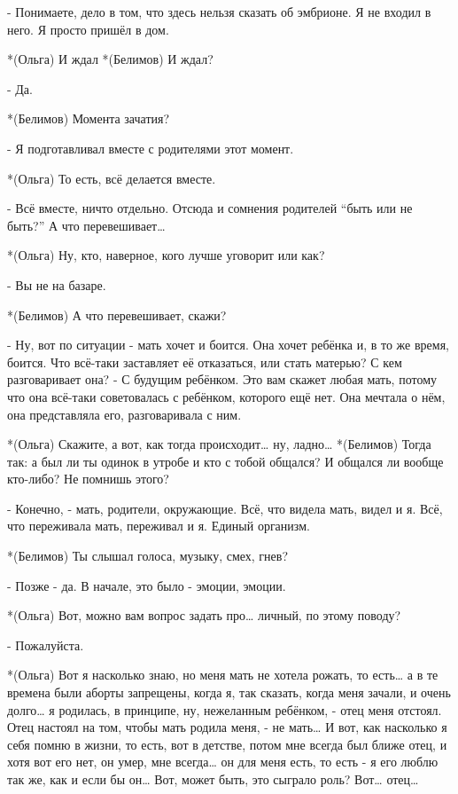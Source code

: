 - Понимаете, дело в том, что здесь нельзя сказать об эмбрионе. Я не входил в него. Я просто пришёл в дом.

*(Ольга) И ждал
*(Белимов) И ждал?

- Да.

*(Белимов) Момента зачатия?

- Я подготавливал вместе с родителями этот момент.

*(Ольга) То есть, всё делается вместе.

- Всё вместе, ничто отдельно. Отсюда и сомнения родителей “быть или не быть?” А что перевешивает…

*(Ольга) Ну, кто, наверное, кого лучше уговорит или как?

- Вы не на базаре.

*(Белимов) А что перевешивает, скажи?

- Ну, вот по ситуации - мать хочет и боится. Она хочет ребёнка и, в то же время, боится. Что всё-таки заставляет её отказаться, или стать матерью? С кем разговаривает она? - С будущим ребёнком. Это вам скажет любая мать, потому что она всё-таки советовалась с ребёнком, которого ещё нет. Она мечтала о нём, она представляла его, разговаривала с ним.

*(Ольга) Скажите, а вот, как тогда происходит… ну, ладно…
*(Белимов) Тогда так: а был ли ты одинок в утробе и кто с тобой общался? И общался ли вообще кто-либо? Не помнишь этого?

- Конечно, - мать, родители, окружающие. Всё, что видела мать, видел и я. Всё, что переживала мать, переживал и я. Единый организм.

*(Белимов) Ты слышал голоса, музыку, смех, гнев?

- Позже - да. В начале, это было - эмоции, эмоции.

*(Ольга) Вот, можно вам вопрос задать про… личный, по этому поводу?

- Пожалуйста.

*(Ольга) Вот я насколько знаю, но меня мать не хотела рожать, то есть… а в те времена были аборты запрещены, когда я, так сказать, когда меня зачали, и очень долго… я родилась, в принципе, ну, нежеланным ребёнком, - отец меня отстоял. Отец настоял на том, чтобы мать родила меня, - не мать… И вот, как насколько я себя помню в жизни, то есть, вот в детстве, потом мне всегда был ближе отец, и хотя вот его нет, он умер, мне всегда… он для меня есть, то есть - я его люблю так же, как и если бы он… Вот, может быть, это сыграло роль? Вот… отец…

